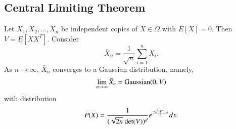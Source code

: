 \subsection{Central Limiting Theorem}
Let $X_{1}, X_{2}, \ldots, X_{n}$ be independent copies of $X\in \Omega$ with $E\left[ X\right] = 0$. Then $V=E\left[ XX^T\right] $.
Consider 
$$
\bar{X}_{n}=\frac{1}{\sqrt{n}} \sum\limits_{i=1}^{n} X_{i}.
$$ 
As $n\rightarrow \infty$, $\bar{X}_{n}$ converges to a Gaussian distribution, namely,
$$
\lim_{n \rightarrow \infty} \bar{X}_{n}= {\rm Gaussian}(0, V)
$$
with distribution
$$
P(X)=\frac{1}{(\sqrt{2 n}\ {\rm det}(V))^{d}} e^{\frac{-x^{T}V^{-1}x}{2}}d x.
$$ 
% 
